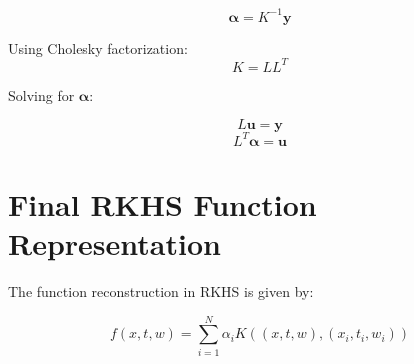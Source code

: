 \documentclass{article}
\begin{document}
\[
\boldsymbol{\alpha} = K^{-1} \mathbf{y}
\]

Using Cholesky factorization:
\[
K = L L^T
\]

Solving for \( \boldsymbol{\alpha} \):

\[
L \mathbf{u} = \mathbf{y}
\]
\[
L^T \boldsymbol{\alpha} = \mathbf{u}
\]

\section{Final RKHS Function Representation}
The function reconstruction in RKHS is given by:

\[
f(x, t, w) = \sum_{i=1}^{N} \alpha_i K((x,t,w), (x_i,t_i,w_i))
\]
\end{document}
